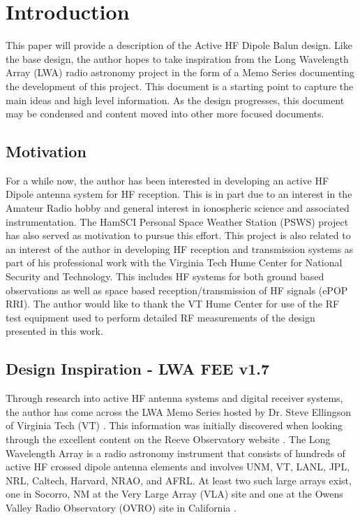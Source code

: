 \section{Introduction}
\label{sec:introduction}
This paper will provide a description of the Active HF Dipole Balun design. 
Like the base design, the author hopes to take inspiration from the Long Wavelength Array (LWA) radio astronomy project in the form of a Memo Series documenting the development of this project.
This document is a starting point to capture the main ideas and high level information.
As the design progresses, this document may be condensed and content moved into other more focused documents.

\subsection{Motivation}
\label{subsec:intro:motivation}
For a while now, the author has been interested in developing an active HF Dipole antenna system for HF reception.
This is in part due to an interest in the Amateur Radio hobby and general interest in ionospheric science and associated instrumentation.
The HamSCI Personal Space Weather Station (PSWS) project has also served as motivation to pursue this effort.
This project is also related to an interest of the author in developing HF reception and transmission systems as part of his professional work with the Virginia Tech Hume Center for National Security and Technology.
This includes HF systems for both ground based observations as well as space based reception/transmission of HF signals (ePOP RRI).
The author would like to thank the VT Hume Center for use of the RF test equipment used to perform detailed RF measurements of the design presented in this work.

\subsection{Design Inspiration - LWA FEE v1.7}
\label{subsec:intro:design inspiration}
Through research into active HF antenna systems and digital receiver systems, the author has come across the LWA Memo Series hosted by Dr. Steve Ellingson of Virginia Tech (VT) \cite{lwa_memo}. 
This information was initially discovered when looking through the excellent content on the Reeve Observatory website \cite{reeve_observatory}.
The Long Wavelength Array is a radio astronomy instrument that consists of hundreds of active HF crossed dipole antenna elements and involves UNM, VT, LANL, JPL, NRL, Caltech, Harvard, NRAO, and AFRL.
At least two such large arrays exist, one in Socorro, NM at the Very Large Array (VLA) site \cite{lwa_vla} and one at the Owens Valley Radio Observatory (OVRO) site in California \cite{lwa_ovro}.


